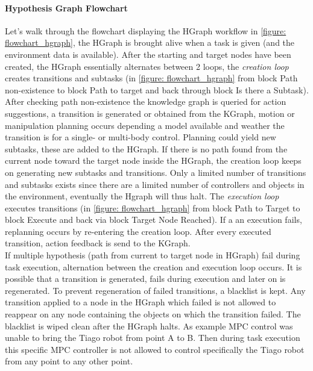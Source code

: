 \paragraph{Hypothesis Graph Flowchart}
Let's walk through the flowchart displaying the HGraph workflow in \cref{figure: flowchart_hgraph}, the HGraph is brought alive when a task is given (and the environment data is available). After the starting and target nodes have been created, the HGraph essentially alternates between 2 loops, the \textit{creation loop} creates transitions and subtasks (in \cref{figure: flowchart_hgraph} from block Path non-existence to block Path to target and back through block Is there a Subtask). After checking path non-existence the knowledge graph is queried for action suggestions, a transition is generated or obtained from the KGraph, motion or manipulation planning occurs depending a model available and weather the transition is for a single- or multi-body control. Planning could yield new subtasks, these are added to the HGraph. If there is no path found from the current node toward the target node inside the HGraph, the creation loop keeps on generating new subtasks and transitions. Only a limited number of transitions and subtasks exists since there are a limited number of controllers and objects in the environment, eventually the Hgraph will thus halt. The \textit{execution loop} executes transitions (in \cref{figure: flowchart_hgraph} from block Path to Target to block Execute and back via block Target Node Reached). If a an execution fails, replanning occurs by re-entering the creation loop. After every executed transition, action feedback is send to the KGraph.\\

If multiple hypothesis (path from current to target node in HGraph) fail during task execution, alternation between the creation and execution loop occurs. It is possible that a transition is generated, fails during execution and later on is regenerated. To prevent regeneration of failed transitions, a blacklist is kept. Any transition applied to a node in the HGraph which failed is not allowed to reappear on any node containing the objects on which the transition failed. The blacklist is wiped clean after the HGraph halts. As example \ac{MPC} control was unable to bring the Tiago robot from point A to B. Then during task execution this specific \ac{MPC} controller is not allowed to control specifically the Tiago robot from any point to any other point. \\


